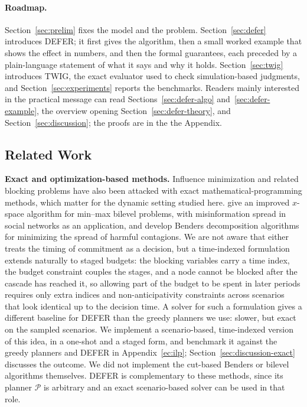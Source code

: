 \documentclass[ASNA,number]{USG}
\begin{document}
\paragraph{Roadmap.} Section~\ref{sec:prelim} fixes the model and the
problem. Section~\ref{sec:defer} introduces DEFER; it first gives the
algorithm, then a small worked example that shows the effect in numbers,
and then the formal guarantees, each preceded by a plain-language statement
of what it says and why it holds. Section~\ref{sec:twig} introduces TWIG, the
exact evaluator used to check simulation-based judgments, and
Section~\ref{sec:experiments} reports the benchmarks. Readers mainly
interested in the practical message can read Sections~\ref{sec:defer-algo}
and~\ref{sec:defer-example}, the overview opening
Section~\ref{sec:defer-theory}, and Section~\ref{sec:discussion}; the proofs
are in the the Appendix.

\subsection{Related Work}\label{sec:related}

\textbf{Exact and optimization-based methods.} Influence minimization and
related blocking problems have also been attacked with exact
mathematical-programming methods, which matter for the dynamic setting studied
here. \citet{taninmis2022} give an improved $x$-space algorithm for min--max
bilevel problems, with misinformation spread in social networks as an
application, and \citet{taninmis2024} develop Benders decomposition algorithms
for minimizing the spread of harmful contagions. We are not aware that either
treats the timing of commitment as a decision, but a time-indexed formulation
extends naturally to staged budgets: the blocking variables carry a time
index, the budget constraint couples the stages, and a node cannot be blocked
after the cascade has reached it, so allowing part of the budget to be spent
in later periods requires only extra indices and non-anticipativity
constraints across scenarios that look identical up to the decision time. A
solver for such a formulation gives a different baseline for DEFER than the
greedy planners we use: slower, but exact on the sampled scenarios. We implement a
scenario-based, time-indexed version of this idea, in a one-shot and a staged
form, and benchmark it against the greedy planners and DEFER in
Appendix~\ref{ec:ilp}; Section~\ref{sec:discussion-exact} discusses
the outcome. We did not implement the cut-based Benders or bilevel algorithms
themselves. DEFER is complementary to these methods, since its planner
$\mathcal P$ is arbitrary and an exact scenario-based solver can be used in
that role.
\end{document}
